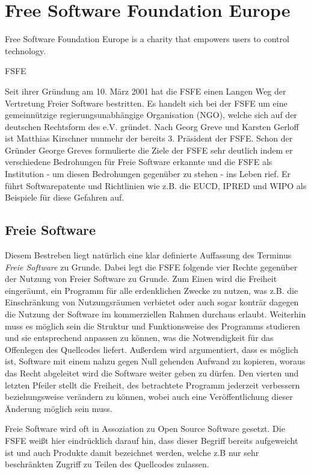 \section{Free Software Foundation Europe}
\epigraph{Free Software Foundation Europe is a charity that empowers
users to control technology.}{FSFE}
Seit ihrer Gründung am 10. März 2001 hat die FSFE einen Langen Weg der 
Vertretung Freier Software bestritten. Es handelt sich bei der FSFE 
um eine gemeinnützige regierungsunabhängige Organisation (NGO), welche sich
auf der deutschen Rechtsform des e.V. gründet. Nach Georg 
Greve und Karsten Gerloff ist Matthias Kirschner nunmehr der bereits 3. 
Präsident der FSFE. Schon der Gründer George Greves formulierte die Ziele der 
FSFE sehr deutlich indem er verschiedene Bedrohungen für Freie Software 
erkannte und die FSFE als Institution - um diesen Bedrohungen gegenüber zu 
stehen - ins Leben rief.\cite{PLGreveInterView} Er führt Softwarepatente und Richtlinien wie z.B. die EUCD, IPRED und 
WIPO als Beispiele für diese Gefahren auf.

\subsection{Freie Software}
Diesem Bestreben liegt natürlich eine klar definierte Auffassung des Terminus 
\emph{Freie Software} zu Grunde. Dabei legt die FSFE folgende vier
Rechte gegenüber der Nutzung von Freier Software zu Grunde. Zum Einen
wird die Freiheit eingeräumt, ein Programm für alle erdenklichen Zwecke zu 
nutzen, was z.B. die Einschränkung von Nutzungsräumen verbietet oder
auch sogar konträr dagegen die Nutzung der Software im kommerziellen Rahmen 
durchaus
erlaubt. Weiterhin muss es möglich sein die Struktur und Funktionsweise des 
Programms studieren und sie entsprechend
anpassen zu können, was die Notwendigkeit für das Offenlegen des Quellcodes 
liefert. Außerdem wird argumentiert, dass es möglich ist, Software mit einem 
nahzu gegen Null gehenden Aufwand zu kopieren, woraus das Recht abgeleitet wird
die Software weiter geben zu dürfen. Den
vierten und letzten Pfeiler stellt die Freiheit, des betrachtete Programm
jederzeit verbessern beziehungsweise verändern zu können, wobei auch eine 
Veröffentlichung dieser Änderung möglich sein muss.\cite{FsfeFs}

Freie Software wird oft in Assoziation zu Open Source Software gesetzt. Die
FSFE weißt hier eindrücklich darauf hin, dass dieser Begriff bereits aufgeweicht
ist und auch Produkte damit bezeichnet werden, welche z.B nur sehr beschränkten
Zugriff zu Teilen des Quellcodes zulassen.

